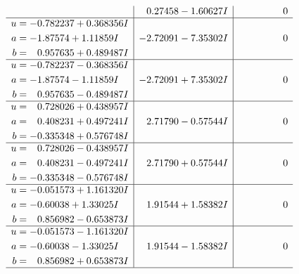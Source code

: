 \documentclass[1p]{elsarticle_modified}
\theoremstyle{definition}
\begin{document}
$$\begin{array}{c|c|c}
 & \phantom{-}0.27458 - 1.60627 I & \phantom{-0.000000 } 0 \\ \hline\begin{aligned}
u &= -0.782237 + 0.368356 I \\
a &= -1.87574 + 1.11859 I \\
b &= \phantom{-}0.957635 + 0.489487 I\end{aligned}
 & -2.72091 - 7.35302 I & \phantom{-0.000000 } 0 \\ \hline\begin{aligned}
u &= -0.782237 - 0.368356 I \\
a &= -1.87574 - 1.11859 I \\
b &= \phantom{-}0.957635 - 0.489487 I\end{aligned}
 & -2.72091 + 7.35302 I & \phantom{-0.000000 } 0 \\ \hline\begin{aligned}
u &= \phantom{-}0.728026 + 0.438957 I \\
a &= \phantom{-}0.408231 + 0.497241 I \\
b &= -0.335348 + 0.576748 I\end{aligned}
 & \phantom{-}2.71790 - 0.57544 I & \phantom{-0.000000 } 0 \\ \hline\begin{aligned}
u &= \phantom{-}0.728026 - 0.438957 I \\
a &= \phantom{-}0.408231 - 0.497241 I \\
b &= -0.335348 - 0.576748 I\end{aligned}
 & \phantom{-}2.71790 + 0.57544 I & \phantom{-0.000000 } 0 \\ \hline\begin{aligned}
u &= -0.051573 + 1.161320 I \\
a &= -0.60038 + 1.33025 I \\
b &= \phantom{-}0.856982 - 0.653873 I\end{aligned}
 & \phantom{-}1.91544 + 1.58382 I & \phantom{-0.000000 } 0 \\ \hline\begin{aligned}
u &= -0.051573 - 1.161320 I \\
a &= -0.60038 - 1.33025 I \\
b &= \phantom{-}0.856982 + 0.653873 I\end{aligned}
 & \phantom{-}1.91544 - 1.58382 I & \phantom{-0.000000 } 0\\
 \hline 
 \end{array}$$\newpage$$\begin{array}{c|c|c}  

\end{array}$$
\end{document}
